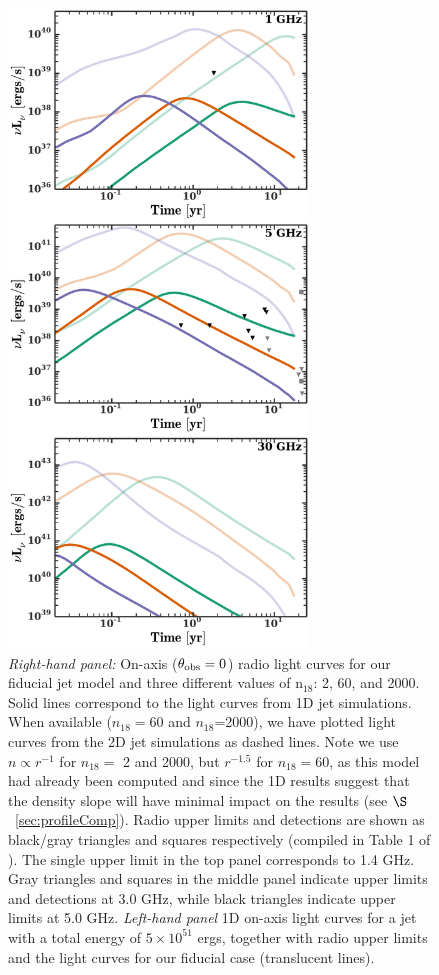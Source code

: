 \documentclass[usenatbib,fleqn]{mnras}
\begin{document}
\begin{figure}
  \includegraphics[width=8cm]{lightcurves_en.pdf}
  \caption{\label{fig:lightcurves} \textit{Right-hand panel:} On-axis
    ($\theta_{\rm obs}=0$) radio light curves for our fiducial jet
    model and three different values of n$_{18}$: 2, 60, and
    2000. Solid lines correspond to the light curves from 1D jet
    simulations. When available ($n_{18}=60$ and $n_{18}$=2000), we
    have plotted light curves from the 2D jet simulations as dashed
    lines. Note we use $n\propto r^{-1}$ for $n_{18}=$ 2 and 2000, but
    $r^{-1.5}$ for $n_{18}=60$, as this model had already been
    computed and since the 1D results suggest that the density slope
    will have minimal impact on the results (see
    $\S$~\ref{sec:profileComp}).  Radio upper limits and detections
    are shown as black/gray triangles and squares respectively
    (compiled in Table 1 of \citealt{Mimica+2015}). The single upper
    limit in the top panel corresponds to 1.4 GHz. Gray triangles and
    squares in the middle panel indicate upper limits and detections
    at 3.0 GHz, while black triangles indicate upper limits at 5.0
    GHz. \textit{Left-hand panel} 1D on-axis light curves for a jet
    with a total energy of $5\times 10^{51}$ ergs, together with radio
    upper limits and the light curves for our fiducial case
    (translucent lines).}
\end{figure}
\end{document}
